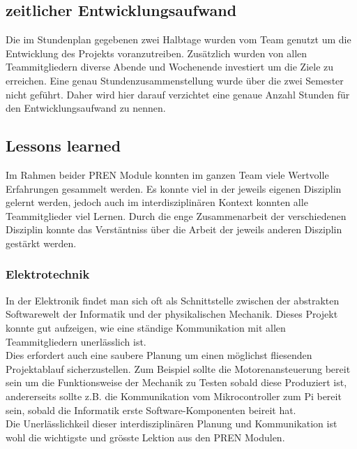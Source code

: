 \documentclass[../../main.tex]{subfiles}
\begin{document}
    \nocite{PiShopPi3ModelBp}
    \nocite{PiShopPiZero}
    \nocite{PiShopBrightPi}
    \nocite{PiShopPiKamera}
    \nocite{PlayZonePassiverBuzzer}
    \nocite{ReicheltStromPi}
    \nocite{ReicheltStromPiAkku}
    \nocite{AliExpressADXL345}
    \nocite{WisIBT2}
    \nocite{WishDCDCConverter}
    \nocite{AliExpressHCSR04}
    \nocite{AliExpressVL53L0X}
    \nocite{AliExpressLM2596}
    \nocite{Distrelec13FR200E}
    \nocite{AliExpress5V33VConverter}
    \nocite{WishTowerpro48}
    \nocite{WishTowerpro48}
    \nocite{MadlerZahnriemen}
    \nocite{MadlerZahnriemenrad}
    \nocite{MadlerKupplung}
    \nocite{MadlerZahnrad}

\subsection{zeitlicher Entwicklungsaufwand}
Die im Stundenplan gegebenen zwei Halbtage wurden vom Team genutzt um die Entwicklung des Projekts voranzutreiben. Zusätzlich wurden von allen Teammitgliedern diverse Abende und Wochenende investiert um die Ziele zu erreichen. Eine genau Stundenzusammenstellung wurde über die zwei Semester nicht geführt. Daher wird hier darauf verzichtet eine genaue Anzahl Stunden für den Entwicklungsaufwand zu nennen.\\

\subsection{Lessons learned}
Im Rahmen beider PREN Module konnten im ganzen Team viele Wertvolle Erfahrungen gesammelt werden. Es konnte viel in der jeweils eigenen Disziplin gelernt werden, jedoch auch im interdisziplinären Kontext konnten alle Teammitglieder viel Lernen. Durch die enge Zusammenarbeit der verschiedenen Disziplin konnte das Verstäntniss über die Arbeit der jeweils anderen Disziplin gestärkt werden.\\

\subsubsection{Elektrotechnik}
In der Elektronik findet man sich oft als Schnittstelle zwischen der abstrakten Softwarewelt der Informatik und der physikalischen Mechanik. Dieses Projekt konnte gut aufzeigen, wie eine ständige Kommunikation mit allen Teammitgliedern unerlässlich ist.\\
Dies erfordert auch eine saubere Planung um einen möglichst fliesenden Projektablauf sicherzustellen. Zum Beispiel sollte die Motorenansteuerung bereit sein um die Funktionsweise der Mechanik zu Testen sobald diese Produziert ist, andererseits sollte z.B. die Kommunikation vom Mikrocontroller zum Pi bereit sein, sobald die Informatik erste Software-Komponenten beireit hat.\\
Die Unerlässlichkeil dieser interdisziplinären Planung und Kommunikation ist wohl die wichtigste und grösste Lektion aus den PREN Modulen.
\end{document}
